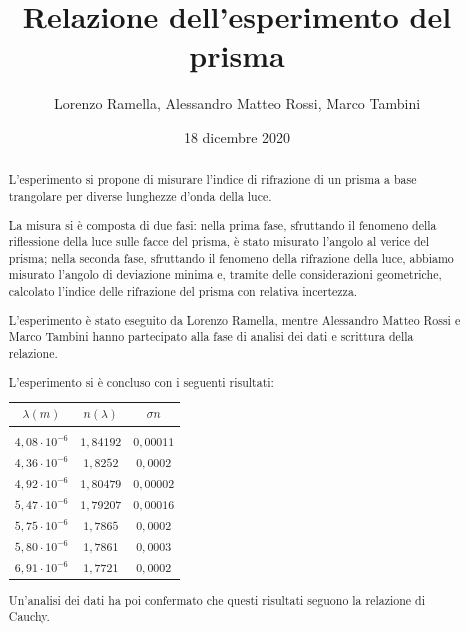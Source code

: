 \documentclass{article}
\title{Relazione dell'esperimento del prisma}
\author{Lorenzo Ramella, Alessandro Matteo Rossi, Marco Tambini}
\date{18 dicembre 2020}
\begin{document}
\maketitle

\begin{abstract}
L’esperimento si propone di misurare l'indice di rifrazione di un prisma a base trangolare per diverse lunghezze d'onda della luce.

La misura si è composta di due fasi: nella prima fase, sfruttando il fenomeno della riflessione della luce sulle facce del prisma, è stato misurato l'angolo al verice del prisma; nella seconda fase, sfruttando il fenomeno della rifrazione della luce, abbiamo misurato l'angolo di deviazione minima e, tramite delle considerazioni geometriche, calcolato l'indice delle rifrazione del prisma con relativa incertezza.

L'esperimento è stato eseguito da Lorenzo Ramella, mentre Alessandro Matteo Rossi e Marco Tambini hanno partecipato alla fase di analisi dei dati e scrittura della relazione.

L'esperimento si è concluso con i seguenti risultati:

\vspace{4mm}

\begin{center}
\begin{tabular}{ ||c | c | c|| }
  \hline
  $\lambda (m)$ & $n (\lambda)$ & $\sigma n$ \\
  \hline \hline && \\ [-0.9ex]
  $4,08 \cdot 10^{-6}$ & $1,84192$ & $0,00011$ \\
  $4,36 \cdot 10^{-6}$ & $1,8252$ & $0,0002$ \\
  $4,92 \cdot 10^{-6}$ & $1,80479$ & $0,00002$ \\
  $5,47 \cdot 10^{-6}$ & $1,79207$ & $0,00016$ \\
  $5,75 \cdot 10^{-6}$ & $1,7865$ & $0,0002$ \\
  $5,80 \cdot 10^{-6}$ & $1,7861$ & $0,0003$ \\
  $6,91 \cdot 10^{-6}$ & $1,7721$ & $0,0002$ \\
  \hline
\end{tabular}
\end{center}

\vspace{4mm}

Un'analisi dei dati ha poi confermato che questi risultati seguono la relazione di Cauchy. 

\end{abstract}
\tableofcontents
\end{document}
